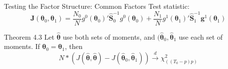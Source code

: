 \documentclass{beamer}
\newcommand{\1}{\mathds{1}} %
\begin{document}

\begin{frame}{Testing the Factor Structure: Common Factors}
    Test statistic:
    \begin{equation}
    \bm J(\bm \theta_0, \bm \theta_1) = \frac{N_0}{N} g^0 (\bm \theta_0)' \widehat{\bm S}_0^{-1} g^0 (\bm \theta_0) + \frac{N_1}{N} g^1 (\bm \theta_1)' \widehat{\bm S}_1^{-1} \bm g^1(\bm \theta_1)
\end{equation}

\begin{block}{Theorem 4.3}
    Let $\widehat{\bm \theta}$ use both sets of moments, and $(\widehat{\bm \theta}_0, \widehat{\bm \theta}_1$ use each set of moments. If $\bm \theta_0 = \bm \theta_1$, then
    \begin{equation*}
        N * \left( J( \widehat{\bm \theta}, \widehat{\bm \theta}) - J(\widehat{\bm \theta}_0, \widehat{\bm \theta}_1)  \right) \stackrel{d}{\rightarrow} \chi^2_{((T_0-p)p)}
    \end{equation*}
\end{block}
\end{frame}






\end{document}
